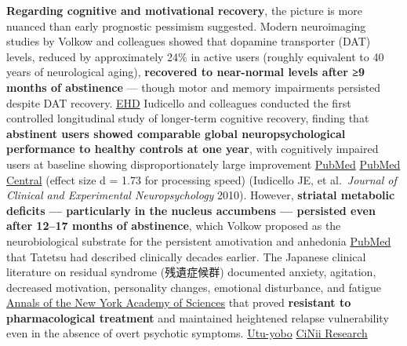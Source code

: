 \textbf{Regarding cognitive and motivational recovery}, the picture is more nuanced than early prognostic pessimism suggested. Modern neuroimaging studies by Volkow and colleagues showed that dopamine transporter (DAT) levels, reduced by approximately 24\% in active users (roughly equivalent to 40 years of neurological aging), \textbf{recovered to near-normal levels after ≥9 months of abstinence} --- though motor and memory impairments persisted despite DAT recovery. \href{https://www.ehd.org/health_meth_6.php}{EHD} Iudicello and colleagues conducted the first controlled longitudinal study of longer-term cognitive recovery, finding that \textbf{abstinent users showed comparable global neuropsychological performance to healthy controls at one year}, with cognitively impaired users at baseline showing disproportionately large improvement \href{https://pubmed.ncbi.nlm.nih.gov/20198527/}{PubMed} \href{https://pmc.ncbi.nlm.nih.gov/articles/PMC2911490/}{PubMed Central} (effect size d = 1.73 for processing speed) (Iudicello JE, et al.~\emph{Journal of Clinical and Experimental Neuropsychology} 2010). However, \textbf{striatal metabolic deficits --- particularly in the nucleus accumbens --- persisted even after 12--17 months of abstinence}, which Volkow proposed as the neurobiological substrate for the persistent amotivation and anhedonia \href{https://pubmed.ncbi.nlm.nih.gov/14754772/}{PubMed} that Tatetsu had described clinically decades earlier. The Japanese clinical literature on residual syndrome (残遺症候群) documented anxiety, agitation, decreased motivation, personality changes, emotional disturbance, and fatigue \href{https://nyaspubs.onlinelibrary.wiley.com/doi/10.1111/j.1749-6632.2000.tb05178.x}{Annals of the New York Academy of Sciences} that proved \textbf{resistant to pharmacological treatment} and maintained heightened relapse vulnerability even in the absence of overt psychotic symptoms. \href{https://utu-yobo.com/column/9800}{Utu-yobo} \href{https://cir.nii.ac.jp/crid/1390006817998290944}{CiNii Research}

